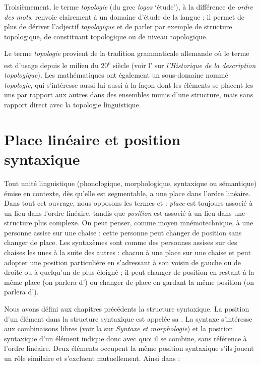 Troisièmement, le terme \textit{topologie} (du grec \textit{logos} ‘étude’), à la différence de \textit{ordre des mots}, renvoie clairement à un domaine d’étude de la langue ; il permet de plus de dériver l’adjectif \textit{topologique} et de parler par exemple de structure topologique, de constituant topologique ou de niveau topologique.

Le terme \textit{topologie} provient de la tradition grammaticale allemande où le terme est d’usage depuis le milieu du 20\textsuperscript{e} siècle (voir l' sur \textit{l’Historique de la description topologique}). Les mathématiques ont également un sous-domaine nommé \textit{topologie}, qui s'intéresse aussi lui aussi à la façon dont les éléments se placent les uns par rapport aux autres dans des ensembles munis d’une structure, mais sans rapport direct avec la topologie linguistique.

\section{Place linéaire et position syntaxique}\label{sec:3.5.3}

Tout unité linguistique (phonologique, morphologique, syntaxique ou sémantique) émise en contexte, dès qu’elle est segmentable, a une place dans l’ordre linéaire. Dans tout cet ouvrage, nous opposons les termes  et  : \textit{place} est toujours associé à un lieu dans l’ordre linéaire, tandis que \textit{position} est associé à un lieu dans une structure plus complexe. On peut penser, comme moyen mnémotechnique, à une personne assise sur une chaise : cette personne peut changer de position sans changer de place. Les syntaxèmes sont comme des personnes assises sur des chaises les unes à la suite des autres : chacun à une place sur une chaise et peut adopter une position particulière en s'adressant à son voisin de gauche ou de droite ou à quelqu'un de plus éloigné ; il peut changer de position en restant à la même place (on parlera d’) ou changer de place en gardant la même position (on parlera d’).

Nous avons défini aux chapitres précédents la structure syntaxique. La position d’un élément dans la structure syntaxique est appelée sa . La syntaxe s’intéresse aux combinaisons libres (voir la  sur \textit{Syntaxe et morphologie}) et la position syntaxique d’un élément indique donc avec quoi il se combine, sans référence à l’ordre linéaire. Deux éléments occupent la même position syntaxique s’ils jouent un rôle similaire et s’excluent mutuellement. Ainsi dans :

